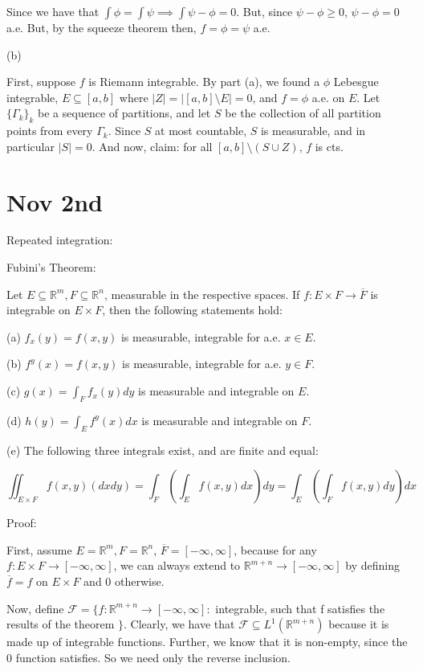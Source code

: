 \documentclass[10pt]{article}
\begin{document}
Since we have that $\int \phi = \int \psi \implies \int \psi - \phi = 0$. But, since $\psi - \phi \geq 0$, $\psi - \phi = 0$ a.e. But, by the squeeze theorem then, $f = \phi = \psi$ a.e.

(b)

First, suppose $f$ is Riemann integrable. By part (a), we found a $\phi$ Lebesgue integrable, $E \subseteq [a,b]$ where $|Z| = | [a,b] \setminus E| =0$, and $f = \phi$ a.e. on $E$. Let $\{ \Gamma_k \}_k$ be a sequence of partitions, and let $S$ be the collection of all partition points from every $\Gamma_k$. Since $S$ at most countable, $S$ is measurable, and in particular $|S| = 0$. And now, claim: for all $ [a,b] \setminus (S \cup Z)$, $f$ is cts.

\section*{Nov 2nd}

Repeated integration:

Fubini’s Theorem:

Let $E \subseteq \mathbb{R}^m, F \subseteq \mathbb{R}^n$, measurable in the respective spaces. If $f: E\times F \to \overline{F}$ is integrable on $E \times F$, then the following statements hold:

(a) $f_x(y) = f(x,y)$ is measurable, integrable for a.e. $x \in E$.

(b) $f^y(x) = f(x,y)$ is measurable, integrable for a.e. $y \in F$.

(c) $g(x) = \int_F f_x(y) dy$ is measurable and integrable on $E$.

(d) $h(y) = \int_E f^y(x) dx$ is measurable and integrable on $F$.

(e) The following three integrals exist, and are finite and equal:

$$ \iint_{E \times F}  f(x,y) (dxdy) = \int_F (\int_E f(x,y) dx) dy = \int_E (\int_F f(x,y) dy) dx$$

Proof:

First, assume $E = \mathbb{R}^m, F = \mathbb{R}^n$, $\overline{F} = [-\infty,\infty]$, because for any $f : E \times F \to [-\infty,\infty]$, we can always extend to $\mathbb{R}^{m+n} \to [-\infty,\infty]$ by defining $\overline{f} = f$ on $E \times F$ and 0 otherwise.

Now, define $\mathcal{F} = \{ f : \mathbb{R}^{m+n} \to [-\infty, \infty] :$ integrable, such that f satisfies the results of the theorem $\}$. Clearly, we have that $\mathcal{F} \subseteq L^1(\mathbb{R}^{m+n})$ because it is made up of integrable functions. Further, we know that it is non-empty, since the 0 function satisfies. So we need only the reverse inclusion.
\end{document}
